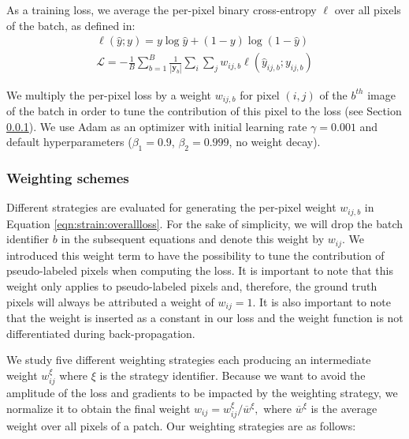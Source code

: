 As a training loss, we average the per-pixel binary cross-entropy $\ell$ over all pixels of the batch, as defined in:
\begin{align}
\ell(\hat{y}; y) = y \log \hat{y} + (1 - y) \log (1 - \hat{y}) \label{eqn:strain:perpixel_crossentropy} \\
\mathcal{L} = - \frac{1}{B} \sum_{b=1}^B \frac{1}{|\mathbf{y}_b|}\sum_{i}\sum_{j} w_{ij, b} \ell(\hat{y}_{ij, b}; y_{ij,b }) 
\label{eqn:strain:overallloss}
\end{align}

We multiply the per-pixel loss by a weight $w_{ij, b}$ for pixel $(i, j)$ of the $b^{th}$ image of the batch in order to tune the contribution of this pixel to the loss (see Section \ref{sssec:strain:weights}).
We use Adam \parencite{kingma2014adam} as an optimizer with initial learning rate $\gamma= 0.001$ and default hyperparameters ($\beta_1 = 0.9$, $\beta_2 = 0.999$, no weight decay).


\subsubsection{Weighting schemes}
\label{sssec:strain:weights}

Different strategies are evaluated for generating the per-pixel weight $w_{ij,b}$ in Equation \ref{eqn:strain:overallloss}. For the sake of simplicity, we will drop the batch identifier $b$ in the subsequent equations and denote this weight by $w_{ij}$. We introduced this weight term to have the possibility to tune the contribution of pseudo-labeled pixels when computing the loss. It is important to note that this weight only applies to pseudo-labeled pixels and, therefore, the ground truth pixels will always be attributed a weight of $w_{ij} = 1$. It is also important to note that the weight is inserted as a constant in our loss and the weight function is not differentiated during back-propagation. 

We study five different weighting strategies each producing an intermediate weight $w^{\xi}_{ij}$ where $\xi$ is the strategy identifier. Because we want to avoid the amplitude of the loss and gradients to be impacted by the weighting strategy, we normalize it to obtain the final weight $w_{ij} = w^{\xi}_{ij}/\overline{w}^{\xi},$
where $\overline{w}^{\xi}$ is the average weight over all pixels of a patch. Our weighting strategies are as follows:

